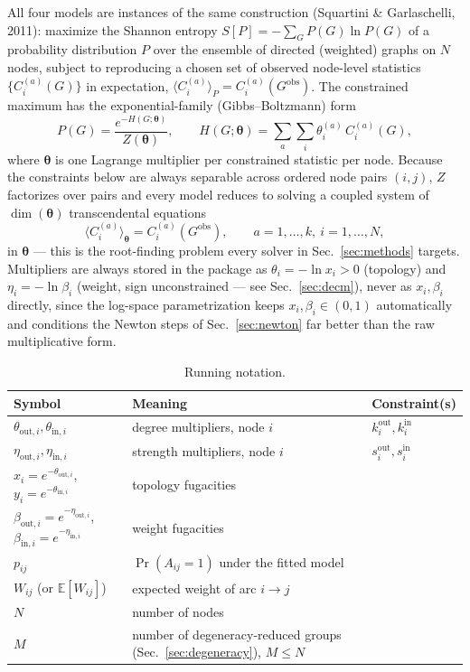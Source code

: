 \documentclass[10pt]{article}
\begin{document}
All four models are instances of the same construction (Squartini \&
Garlaschelli, 2011)\cite{squartini2011}: maximize the Shannon entropy
$S[P] = -\sum_{G} P(G)\ln P(G)$ of a probability distribution $P$ over the
ensemble of directed (weighted) graphs on $N$ nodes, subject to reproducing
a chosen set of observed node-level statistics $\{C^{(a)}_i(G)\}$ in
expectation, $\langle C^{(a)}_i \rangle_P = C^{(a)}_i(G^{\mathrm{obs}})$. The
constrained maximum has the exponential-family (Gibbs--Boltzmann) form
\begin{equation}
P(G) = \frac{e^{-H(G;\boldsymbol\theta)}}{Z(\boldsymbol\theta)}, \qquad
H(G;\boldsymbol\theta) = \sum_a \sum_i \theta^{(a)}_i\, C^{(a)}_i(G),
\end{equation}
where $\boldsymbol\theta$ is one Lagrange multiplier per constrained
statistic per node. Because the constraints below are always separable
across ordered node pairs $(i,j)$, $Z$ factorizes over pairs and every
model reduces to solving a coupled system of $\dim(\boldsymbol\theta)$
transcendental equations
\begin{equation}
\label{eq:generic-constraint}
\langle C^{(a)}_i \rangle_{\boldsymbol\theta} = C^{(a)}_i(G^{\mathrm{obs}}),
\qquad a=1,\dots,k,\ i=1,\dots,N,
\end{equation}
in $\boldsymbol\theta$ --- this is the root-finding problem every solver in
Sec.~\ref{sec:methods} targets. Multipliers are always stored in the package
as $\theta_i = -\ln x_i > 0$ (topology) and $\eta_i = -\ln\beta_i$ (weight,
sign unconstrained --- see Sec.~\ref{sec:decm}), never as $x_i,\beta_i$
directly, since the log-space parametrization keeps $x_i,\beta_i\in(0,1)$
automatically and conditions the Newton steps of Sec.~\ref{sec:newton} far
better than the raw multiplicative form.

\begin{table}[h]
\centering
\small
\begin{tabular}{@{}lll@{}}
\toprule
Symbol & Meaning & Constraint(s) \\
\midrule
$\theta_{\mathrm{out},i},\theta_{\mathrm{in},i}$ & degree multipliers, node $i$ & $k^{\mathrm{out}}_i, k^{\mathrm{in}}_i$ \\
$\eta_{\mathrm{out},i},\eta_{\mathrm{in},i}$ & strength multipliers, node $i$ & $s^{\mathrm{out}}_i, s^{\mathrm{in}}_i$ \\
$x_i=e^{-\theta_{\mathrm{out},i}}$, $y_i=e^{-\theta_{\mathrm{in},i}}$ & topology fugacities & \\
$\beta_{\mathrm{out},i}=e^{-\eta_{\mathrm{out},i}}$, $\beta_{\mathrm{in},i}=e^{-\eta_{\mathrm{in},i}}$ & weight fugacities & \\
$p_{ij}$ & $\Pr(A_{ij}=1)$ under the fitted model & \\
$W_{ij}$ (or $\mathbb E[W_{ij}]$) & expected weight of arc $i\to j$ & \\
$N$ & number of nodes & \\
$M$ & number of degeneracy-reduced groups (Sec.~\ref{sec:degeneracy}), $M\le N$ & \\
\bottomrule
\end{tabular}
\caption{Running notation.}
\label{tab:notation}
\end{table}
\end{document}
